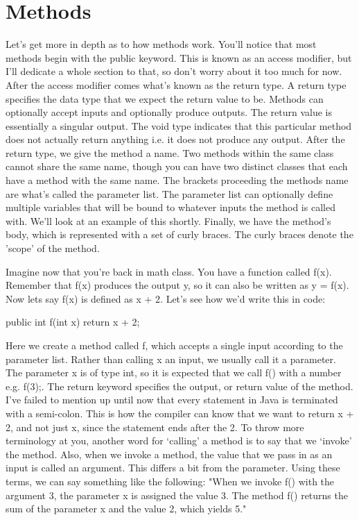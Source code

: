 \documentclass{article}
\begin{document}
\section{Methods}

Let’s get more in depth as to how methods work. You’ll notice that most methods begin with the public keyword.
This is known as an access modifier, but I’ll dedicate a whole section to that, so don’t worry about it too
much for now. After the access modifier comes what’s known as the return type. A return type specifies the
data type that we expect the return value to be. Methods can optionally accept inputs and optionally produce
outputs. The return value is essentially a singular output. The void type indicates that this particular method
does not actually return anything i.e. it does not produce any output. After the return type, we give the
method a name. Two methods within the same class cannot share the same name, though you can have two distinct
classes that each have a method with the same name. The brackets proceeding the methods name are what’s called
the parameter list. The parameter list can optionally define multiple variables that will be bound to whatever
inputs the method is called with. We’ll look at an example of this shortly. Finally, we have the method’s
body, which is represented with a set of curly braces. The curly braces denote the 'scope' of the method.

Imagine now that you’re back in math class. You have a function called f(x). Remember that f(x) produces the
output y, so it can also be written as y = f(x). Now lets say f(x) is defined as x + 2. Let’s see how we’d
write this in code:

\begin{jlst}
public int f(int x) {
    return x + 2;
}
\end{jlst}

Here we create a method called f, which accepts a single input according to the parameter list. Rather than
calling x an input, we usually call it a parameter. The parameter x is of type int, so it is expected that we
call f() with a number e.g. f(3);. The return keyword specifies the output, or return value of the method.
I’ve failed to mention up until now that every statement in Java is terminated with a semi-colon. This is how
the compiler can know that we want to return x + 2, and not just x, since the statement ends after the 2. To
throw more terminology at you, another word for ‘calling’ a method is to say that we ‘invoke’ the method.
Also, when we invoke a method, the value that we pass in as an input is called an argument. This differs a bit
from the parameter. Using these terms, we can say something like the following: "When we invoke f() with the
argument 3, the parameter x is assigned the value 3. The method f() returns the sum of the parameter x and the
value 2, which yields 5."
\end{document}
